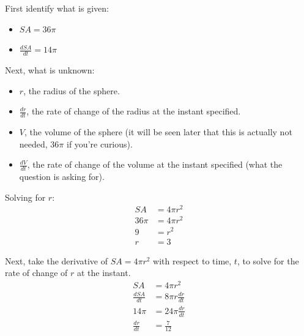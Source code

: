 \documentclass[12pt]{article}
\begin{document}
\begin{enumerate}
                \noindent First identify what is given:
                \begin{itemize}
                    \item $SA = 36 \pi$
                    \item $\frac{dSA}{dt} = 14 \pi$
                \end{itemize}

                \noindent Next, what is unknown:
                \begin{itemize}
                    \item $r$, the radius of the sphere.
                    \item $\frac{dr}{dt}$, the rate of change of the radius at the instant specified.
                    \item $V$, the volume of the sphere (it will be seen later that this is actually not needed, $36 \pi$ if you're curious).
                    \item $\frac{dV}{dt}$, the rate of change of the volume at the instant specified (what the question is asking for).
                \end{itemize}

                \noindent Solving for $r$:
                \begin{align*}
                    SA &= 4 \pi r^2 \\
                    36 \pi &= 4 \pi r^2 \\
                    9 &= r^2 \\
                    r &= 3
                \end{align*}

                \noindent Next, take the derivative of $SA = 4 \pi r^2$ with respect to time, $t$, to solve for the rate of change of $r$ at the instant.
                \begin{align*}
                    SA &= 4 \pi r^2 \\
                    \frac{dSA}{dt} &= 8 \pi r \frac{dr}{dt} \\[6pt]
                    14 \pi &= 24 \pi \frac{dr}{dt} \\[6pt]
                    \frac{dr}{dt} &= \frac{7}{12}
                \end{align*}


\end{enumerate}
\end{document}
